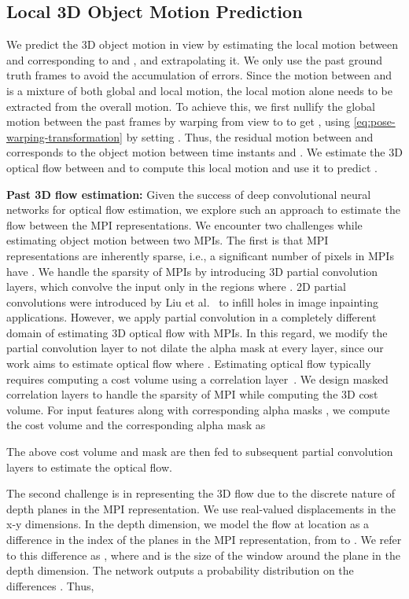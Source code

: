 \documentclass[preprint]{vgtc}
\def\ie{i.e., }
\def\etal{et al.}
\begin{document}
    \subsection{Local 3D Object Motion Prediction}\label{subsec:local-object-motion-prediction}


    We predict the 3D object motion  in view  by estimating the local motion between  and  corresponding to  and , and extrapolating it.
    We only use the past ground truth frames to avoid the accumulation of errors.
    Since the motion between  and  is a mixture of both global and local motion, the local motion alone needs to be extracted from the overall motion.
    To achieve this, we first nullify the global motion between the past frames by warping  from view  to  to get , using \autoref{eq:pose-warping-transformation} by setting .
Thus, the residual motion between  and  corresponds to the object motion between time instants  and .
    We estimate the 3D optical flow between  and  to compute this local motion and use it to predict .

    \textbf{Past 3D flow estimation:}
    Given the success of deep convolutional neural networks for optical flow estimation, we explore such an approach to estimate the flow between the MPI representations.
    We encounter two challenges while estimating object motion between two MPIs.
    The first is that MPI representations are inherently sparse, \ie a significant number of pixels in MPIs have .
    We handle the sparsity of MPIs by introducing 3D partial convolution layers, which convolve the input only in the regions where .
    2D partial convolutions were introduced by Liu \etal~\cite{liu2018pconv} to infill holes in image inpainting applications.
    However, we apply partial convolution in a completely different domain of estimating 3D optical flow with MPIs.
    In this regard, we modify the partial convolution layer to not dilate the alpha mask at every layer, since our work aims to estimate optical flow where .
    Estimating optical flow typically requires computing a cost volume using a correlation layer~\cite{sun2018pwcnet}.
    We design masked correlation layers to handle the sparsity of MPI while computing the 3D cost volume.
    For input features  along with corresponding alpha masks , we compute the cost volume and the corresponding alpha mask as
    
    The above cost volume and mask are then fed to subsequent partial convolution layers to estimate the optical flow.

    The second challenge is in representing the 3D flow due to the discrete nature of depth planes in the MPI representation.
    We use real-valued displacements  in the x-y dimensions.
    In the depth dimension, we model the flow at location  as a difference in the index of the planes in the MPI representation, from  to .
We refer to this difference as , where  and  is the size of the window around the plane  in the depth dimension.
    The network outputs a probability distribution  on the differences .
    Thus,
\end{document}
